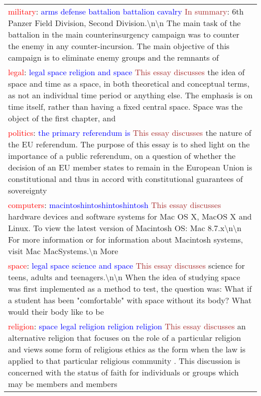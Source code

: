 \begin{table*}
\begin{tabular}{p{}}
\textcolor{red}{military}: \textcolor{blue}{arms defense battalion battalion cavalry} \textcolor{brown}{In summary}: 6th Panzer Field Division, Second Division.\textbackslash n\textbackslash n The main task of the battalion in the main counterinsurgency campaign was to counter the enemy in any counter-incursion. The main objective of this campaign is to eliminate enemy groups and the remnants of \\
\textcolor{red}{legal}: \textcolor{blue}{legal space religion and space} \textcolor{brown}{This essay discusses} the idea of space and time as a space, in both theoretical and conceptual terms, as not an individual time period or anything else. The emphasis is on time itself, rather than having a fixed central space. Space was the object of the first chapter, and \\
\textcolor{red}{politics}: \textcolor{blue}{the primary referendum is} \textcolor{brown}{This essay discusses} the nature of the EU referendum. The purpose of this essay is to shed light on the importance of a public referendum, on a question of whether the decision of an EU member states to remain in the European Union is constitutional and thus in accord with constitutional guarantees of sovereignty \\
\textcolor{red}{computers}: \textcolor{blue}{macintoshintoshintoshintosh} \textcolor{brown}{This essay discusses} hardware devices and software systems for Mac OS X, MacOS X and Linux. To view the latest version of Macintosh OS: Mac 8.7.x\textbackslash n\textbackslash n For more information or for information about Macintosh systems, visit Mac MacSystems.\textbackslash n More \\
\textcolor{red}{space}: \textcolor{blue}{legal space science and space} \textcolor{brown}{This essay discusses} science for teens, adults and teenagers.\textbackslash n\textbackslash n When the idea of studying space was first implemented as a method to test, the question was: What if a student has been "comfortable" with space without its body? What would their body like to be \\
\textcolor{red}{religion}: \textcolor{blue}{space legal religion religion religion} \textcolor{brown}{This essay discusses} an alternative religion that focuses on the role of a particular religion and views some form of religious ethics as the form when the law is applied to that particular religious community . This discussion is concerned with the status of faith for individuals or groups which may be members and members \\

\end{tabular}
\end{table*}
